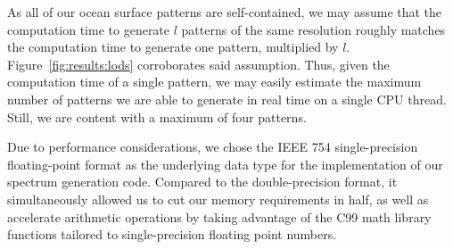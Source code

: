 %
As all of our ocean surface patterns are self-contained, we may assume
that the computation time to generate $l$ patterns of the same resolution
roughly matches the computation time to generate one pattern, multiplied by
$l$. Figure~\ref{fig:results:lods} corroborates said assumption.
Thus, given the computation time of a single pattern, we may easily estimate
the maximum number of patterns we are able to generate in real time on a
single CPU thread. Still, we are content with a maximum of four patterns.

Due to performance considerations, we chose the IEEE 754 single-precision
floating-point format \citep{IEEE:754} as the underlying data type for
the implementation of our spectrum generation code. Compared to the
double-precision format, it simultaneously allowed us to cut our memory
requirements in half, as well as accelerate arithmetic operations by taking
advantage of the C99 \citep{C99} math library functions tailored to
single-precision floating point numbers.
%
%


